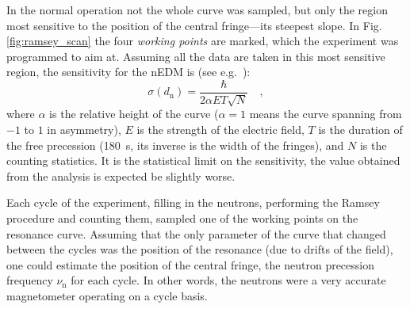 In the normal operation not the whole curve was sampled, but only the region most sensitive to the position of the central fringe---its steepest slope.
In Fig.\,\ref{fig:ramsey_scan} the four \emph{working points} are marked, which the experiment was programmed to aim at.
Assuming all the data are taken in this most sensitive region, the sensitivity for the nEDM is (see e.g.~\cite{FertlThesis}):
\begin{equation}
  \label{eq:nEDM_sensitivity}
  \sigma(d_\text{n}) = \frac{\hbar}{ 2 \alpha E T \sqrt{N} } \quad ,
\end{equation}
where $\alpha$ is the relative height of the curve ($\alpha = 1$ means the curve spanning from $-1$ to $1$ in asymmetry), $E$ is the strength of the electric field, $T$ is the duration of the free precession (\SI{180}{\second}, its inverse is the width of the fringes), and $N$ is the counting statistics.
It is the statistical limit on the sensitivity, the value obtained from the analysis is expected be slightly worse.

Each cycle of the experiment, filling in the neutrons, performing the Ramsey procedure and counting them, sampled one of the working points on the resonance curve.
Assuming that the only parameter of the curve that changed between the cycles was the position of the resonance (due to drifts of the field), one could estimate the position of the central fringe, the neutron precession frequency $\nu_\text{n}$ for each cycle.
In other words, the neutrons were a very accurate magnetometer operating on a cycle basis.

